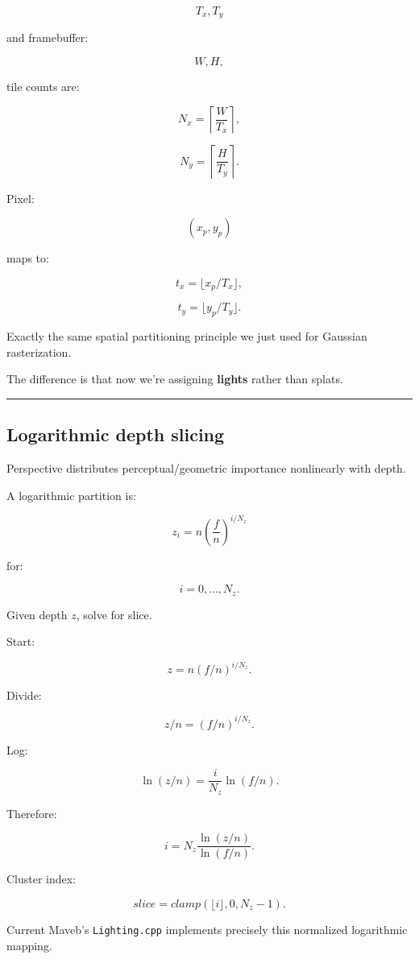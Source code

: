 \[
T_x,T_y
\]

and framebuffer:

\[
W,H,
\]

tile counts are:

\[
N_x=
\left\lceil\frac{W}{T_x}\right\rceil,
\]

\[
N_y=
\left\lceil\frac{H}{T_y}\right\rceil.
\]

Pixel:

\[
(x_p,y_p)
\]

maps to:

\[
t_x=
\lfloor x_p/T_x\rfloor,
\]

\[
t_y=
\lfloor y_p/T_y\rfloor.
\]

Exactly the same spatial partitioning principle we just used for Gaussian rasterization.

The difference is that now we're assigning \textbf{lights} rather than splats.

\begin{center}\rule{0.5\linewidth}{0.5pt}\end{center}

\subsection{Logarithmic depth slicing}\label{04-visual-computing-ii-ch040-logarithmic-depth-slicing}

Perspective distributes perceptual/geometric importance nonlinearly with depth.

A logarithmic partition is:

\[
\boxed{
z_i
=
n
\left(
\frac fn
\right)^{i/N_z}
}
\]

for:

\[
i=0,\dots,N_z.
\]

Given depth \(z\), solve for slice.

Start:

\[
z=
n(f/n)^{i/N_z}.
\]

Divide:

\[
z/n=
(f/n)^{i/N_z}.
\]

Log:

\[
\ln(z/n)
=
\frac i{N_z}
\ln(f/n).
\]

Therefore:

\[
\boxed{
i
=
N_z
\frac{
\ln(z/n)
}{
\ln(f/n)
}.
}
\]

Cluster index:

\[
slice=
clamp(
\lfloor i\rfloor,
0,
N_z-1
).
\]

Current Maveb's \texttt{Lighting.cpp} implements precisely this normalized logarithmic mapping.

